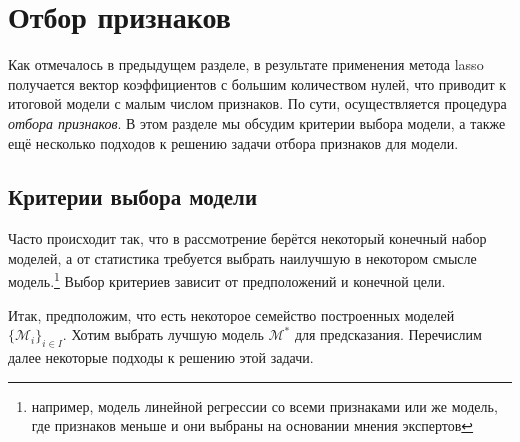 \documentclass[12pt,a4paper,final]{article}
\newcommand{\1}{\mathds{1}}
\begin{document}
\section{Отбор признаков}
\label{sec:sel}

Как отмечалось в предыдущем разделе, в результате применения метода lasso получается вектор коэффициентов с большим количеством нулей, что приводит к итоговой модели с малым числом признаков. По сути, осуществляется процедура \textit{отбора признаков}. В этом разделе мы обсудим критерии выбора модели, а также ещё несколько подходов к решению задачи отбора признаков для модели.

\subsection{Критерии выбора модели}
\label{sec:crit}
Часто происходит так, что в рассмотрение берётся некоторый конечный набор моделей, а от статистика требуется выбрать наилучшую в некотором смысле модель.\footnote{например, модель линейной регрессии со всеми признаками или же модель, где признаков меньше и они выбраны на основании мнения экспертов} Выбор критериев зависит от предположений и конечной цели.

Итак, предположим, что есть некоторое семейство построенных моделей $\{\mathcal M_i\}_{i \in I}$. Хотим выбрать лучшую модель $\mathcal M^*$ для предсказания. Перечислим далее некоторые подходы к решению этой задачи.
\end{document}
